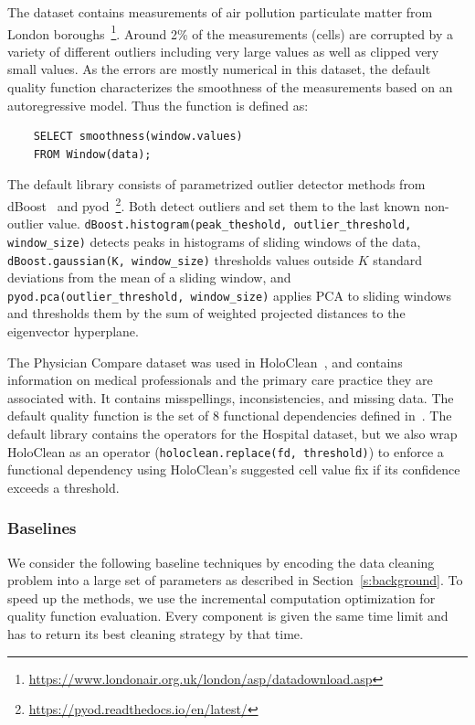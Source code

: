  The dataset contains measurements of air pollution particulate matter from London boroughs~\footnote{\url{https://www.londonair.org.uk/london/asp/datadownload.asp}}. Around 2\% of the measurements (cells) are corrupted by a variety of different outliers including very large values as well as clipped very small values.  As the errors are mostly numerical in this dataset, the default quality function characterizes the smoothness of the measurements based on an autoregressive model.  Thus the function is defined as:
\begin{verbatim}
    SELECT smoothness(window.values) 
    FROM Window(data);
\end{verbatim}
\noindent The default library consists of parametrized outlier detector methods from dBoost~\cite{mariet2016outlier} and pyod~\footnote{\url{https://pyod.readthedocs.io/en/latest/}}.  Both detect outliers and set them to the last known non-outlier value. \texttt{dBoost.histogram(peak\_theshold, outlier\_threshold, window\_size)} detects peaks in histograms of sliding windows of the data, \texttt{dBoost.gaussian(K, window\_size)} thresholds values outside $K$ standard deviations  from the mean of a sliding window, and \texttt{pyod.pca(outlier\_threshold, window\_size)}  applies PCA to sliding windows and thresholds them by the sum of weighted projected distances to the eigenvector hyperplane.

 The Physician Compare dataset was used in HoloClean~\cite{rekatsinas2017holoclean}, and contains information on medical professionals and the primary care practice they are associated with.  It contains misspellings, inconsistencies, and missing data. The default quality function is the set of 8 functional dependencies defined in~\cite{rekatsinas2017holoclean}.  The default library contains the operators for the Hospital dataset, but we also wrap HoloClean as an operator (\texttt{holoclean.replace(fd, threshold)}) to enforce a functional dependency using HoloClean's suggested cell value fix if its confidence exceeds a threshold.

\subsubsection{Baselines}
We consider the following baseline techniques by encoding the data cleaning problem into a large set of parameters as described in Section~\ref{s:background}. To speed up the methods, we use the incremental computation optimization for quality function evaluation. Every component is given the same time limit and has to return its best cleaning strategy by that time. 

